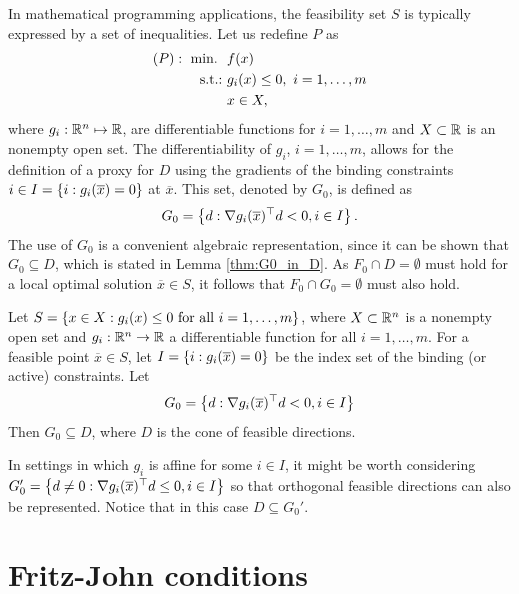 In mathematical programming applications, the feasibility set $S$ is typically expressed by a set of inequalities. Let us redefine $P$ as
%
\begin{align*}
	(P) :~ \mathop{\text{min.~}} \ & f(x)\\
	\mathop{\text{s.t.:~}}  &g_i(x) \leq 0, \ i=1,\dots,m\\
	&x \in X,
\end{align*}
%
where $g_i: \mathbb{R}^n \mapsto \mathbb{R}$, are differentiable functions for $i = 1, \dots, m$ and $X \subset \mathbb{R}$ is an nonempty open set. The differentiability of $g_i$, $i=1, \dots, m$, allows for the definition of a proxy for $D$ using the gradients of the binding constraints $i \in I = \left\{ i:g_i(\overline{x}) = 0 \right \}$ at $\overline{x}$. This set, denoted by $G_0$, is defined as
%
\begin{align*}
	G_0 = \left\{ d : \nabla g_i(\overline{x})^\top d < 0, i \in I \right \}.
\end{align*}
%
The use of $G_0$ is a convenient algebraic representation, since it can be shown that $G_0 \subseteq D$, which is stated in Lemma \ref{thm:G0_in_D}. As $F_0 \cap D = \emptyset$ must hold for a local optimal solution $\overline{x}\in S$, it follows that $F_0 \cap G_0 = \emptyset$ must also hold.
%
\begin{lemma}\label{thm:G0_in_D}
Let $S = \left\{  x \in X : g_i(x) \leq 0 \text{ for all } i=1,\dots,m \right \}$, where $X \subset \mathbb{R}^n$ is a nonempty open set and $g_i : \mathbb{R}^n \rightarrow \mathbb{R}$ a differentiable function for all $i = 1,\dots,m$. For a feasible point $\overline{x} \in S$, let $I = \left\{ i:g_i(\overline{x}) = 0 \right \}$ be the index set of the binding (or active) constraints. Let
$$ G_0 = \left\{ d : \nabla g_i(\overline{x})^\top d < 0, i \in I \right \}$$
Then $G_0 \subseteq D$, where $D$ is the cone of feasible directions.
\end{lemma}
%
In settings in which $g_i$ is affine for some $i \in I$, it might be worth considering \lb $G_0' = \left\{ d \neq 0: \nabla g_i (\overline{x})^\top d \leq 0, i \in I \right \}$ so that orthogonal feasible directions can also be represented. Notice that in this case $D \subseteq G_0'$.


\section{Fritz-John conditions}

